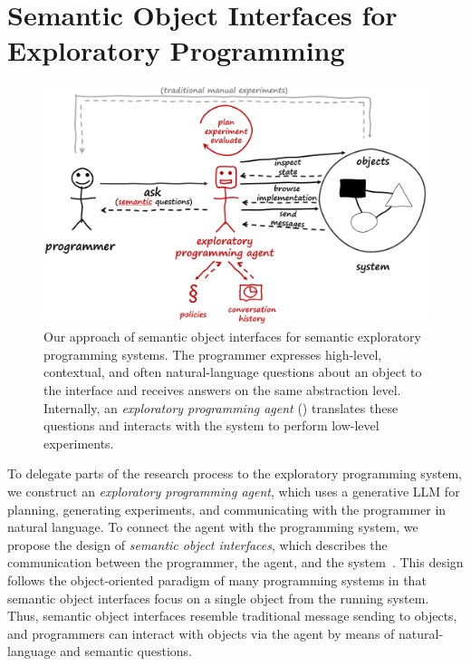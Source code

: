 
\section{Semantic Object Interfaces for Exploratory Programming}
\label{sec:design/agent}

\begin{figure}
	\centering
	\includegraphics[width=.9\textwidth]{03_agent/framework.png}
	\caption[Our approach of \emph{semantic object interfaces} for semantic ex\-plo\-ra\-to\-ry programming systems.]{
		Our approach of semantic object interfaces for semantic exploratory programming systems.
		The programmer expresses high-level, contextual, and often natural-language questions about an object to the interface and receives answers on the same abstraction level.
		Internally, an \emph{exploratory programming agent} (\bold{\textcolor[HTML]{c00000}{red}}) translates these questions and interacts with the system to perform low-level experiments.
	}
	\label{fig:design/agent/framework}
\end{figure}

To delegate parts of the research process to the exploratory programming system, we construct an \emph{exploratory programming agent}, which uses a generative LLM for planning, generating experiments, and communicating with the programmer in natural language.
To connect the agent with the programming system, we propose the design of \emph{semantic object interfaces}, which describes the communication between the programmer, the agent, and the system~\cite{thiede2024talking}.
This design follows the object-oriented paradigm of many programming systems in that semantic object interfaces focus on a single object from the running system.
Thus, semantic object interfaces resemble traditional message sending to objects, and programmers can interact with objects via the agent by means of natural-language and semantic questions.

